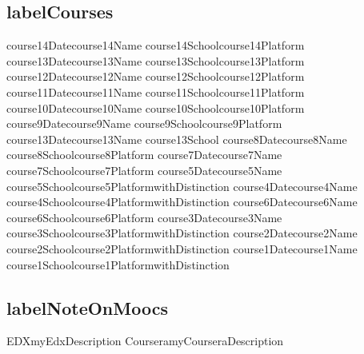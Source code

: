 \documentclass[11pt,a4paper]{moderncv}
\begin{document}
\subsection{labelCourses}
\cventry%
    {course14Date}{course14Name}
    {course14School}{course14Platform}{}{}
\cventry%
    {course13Date}{course13Name}
    {course13School}{course13Platform}{}{}
\cventry%
    {course12Date}{course12Name}
    {course12School}{course12Platform}{}{}
\cventry%
    {course11Date}{course11Name}
    {course11School}{course11Platform}{}{}
\cventry%
    {course10Date}{course10Name}
    {course10School}{course10Platform}{}{}
\cventry%
    {course9Date}{course9Name}
    {course9School}{course9Platform}{}{}
\cventry%
    {course13Date}{course13Name}
    {course13School}{}{}{}
\cventry%
    {course8Date}{course8Name}
    {course8School}{course8Platform}{}{}
\cventry%
    {course7Date}{course7Name}
    {course7School}{course7Platform}{}{}
\cventry%
    {course5Date}{course5Name}
    {course5School}{course5Platform}{}{withDistinction}
\cventry%
    {course4Date}{course4Name}
    {course4School}{course4Platform}{}{withDistinction}
\cventry%
    {course6Date}{course6Name}
    {course6School}{course6Platform}{}{}
\cventry%
    {course3Date}{course3Name}
    {course3School}{course3Platform}{}{withDistinction}
\cventry%
    {course2Date}{course2Name}
    {course2School}{course2Platform}{}{withDistinction}
\cventry%
    {course1Date}{course1Name}
    {course1School}{course1Platform}{}{withDistinction}
\subsection{labelNoteOnMoocs}
\cvdoubleitem%
    {EDX}{\small myEdxDescription }
    {Coursera}{\small myCourseraDescription }
\end{document}
